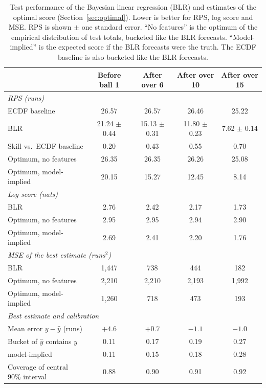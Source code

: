 \documentclass{article}
\newcommand{\1}{\mathbf{1}}
\begin{document}
\begin{table}[t]
\centering
\caption{Test performance of the Bayesian linear regression (BLR) and estimates of the optimal score (Section~\ref{sec:optimal}). Lower is better for RPS, log score and MSE. RPS is shown $\pm$ one standard error. ``No features'' is the optimum of the empirical distribution of test totals, bucketed like the BLR forecasts. ``Model-implied'' is the expected score if the BLR forecasts were the truth. The ECDF baseline is also bucketed like the BLR forecasts.}
\label{tab:demo}
\small
\begin{tabular}{lcccc}
\toprule
 & Before ball 1 & After over 6 & After over 10 & After over 15 \\
\midrule
\multicolumn{5}{l}{\emph{RPS (runs)}} \\
\quad ECDF baseline & 26.57 & 26.57 & 26.46 & 25.22 \\
\quad BLR & 21.24 {\scriptsize $\pm$ 0.44} & 15.13 {\scriptsize $\pm$ 0.31} & 11.80 {\scriptsize $\pm$ 0.23} & 7.62 {\scriptsize $\pm$ 0.14} \\
\quad Skill vs.\ ECDF baseline & 0.20 & 0.43 & 0.55 & 0.70 \\
\quad Optimum, no features & 26.35 & 26.35 & 26.26 & 25.08 \\
\quad Optimum, model-implied & 20.15 & 15.27 & 12.45 & 8.14 \\
\midrule
\multicolumn{5}{l}{\emph{Log score (nats)}} \\
\quad BLR & 2.76 & 2.42 & 2.17 & 1.73 \\
\quad Optimum, no features & 2.95 & 2.95 & 2.94 & 2.90 \\
\quad Optimum, model-implied & 2.69 & 2.41 & 2.20 & 1.76 \\
\midrule
\multicolumn{5}{l}{\emph{MSE of the best estimate (runs$^2$)}} \\
\quad BLR & 1{,}447 & 738 & 444 & 182 \\
\quad Optimum, no features & 2{,}210 & 2{,}210 & 2{,}193 & 1{,}992 \\
\quad Optimum, model-implied & 1{,}260 & 718 & 473 & 193 \\
\midrule
\multicolumn{5}{l}{\emph{Best estimate and calibration}} \\
\quad Mean error $y - \hat y$ (runs) & $+4.6$ & $+0.7$ & $-1.1$ & $-1.0$ \\
\quad Bucket of $\hat y$ contains $y$ & 0.11 & 0.17 & 0.19 & 0.27 \\
\quad \quad model-implied & 0.11 & 0.15 & 0.18 & 0.28 \\
\quad Coverage of central 90\% interval & 0.88 & 0.90 & 0.91 & 0.92 \\
\bottomrule
\end{tabular}
\end{table}
\end{document}

